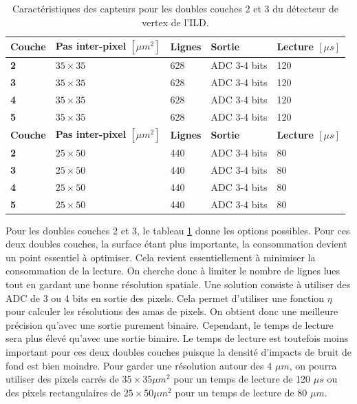   \begin{table}[h]
  \centering
  \begin{tabular}{|l|l|l|l|l|}
  \hline
  \textbf{Couche} & \textbf{Pas inter-pixel $[\mu m^2]$}  & \textbf{Lignes} & \textbf{Sortie} & \textbf{Lecture $[\mu s]$} \\ \hline
  \textbf{2}      & $35 \times 35$                       & 628             & ADC 3-4 bits    & 120                        \\ \hline
  \textbf{3}      & $35 \times 35$                       & 628             & ADC 3-4 bits    & 120                        \\ \hline
  \textbf{4}      & $35 \times 35$                       & 628             & ADC 3-4 bits    & 120                        \\ \hline
  \textbf{5}      & $35 \times 35$                       & 628             & ADC 3-4 bits    & 120                        \\ \hline
  \textbf{Couche} & \textbf{Pas inter-pixel $[\mu m^2]$} & \textbf{Lignes} & \textbf{Sortie} & \textbf{Lecture $[\mu s]$} \\ \hline
  \textbf{2}      & $25 \times 50$                       & 440             & ADC 3-4 bits    & 80                         \\ \hline
  \textbf{3}      & $25 \times 50$                       & 440             & ADC 3-4 bits    & 80                         \\ \hline
  \textbf{4}      & $25 \times 50$                       & 440             & ADC 3-4 bits    & 80                         \\ \hline
  \textbf{5}      & $25 \times 50$                       & 440             & ADC 3-4 bits    & 80                         \\ \hline
  \end{tabular}
  \caption{Caract\'eristiques des capteurs pour les doubles couches 2 et 3 du d\'etecteur de vertex de l'ILD.}
  \label{tab:L2_L5_prop}
  \end{table}
  
  \medskip
  
  Pour les doubles couches 2 et 3, le tableau \ref{tab:L2_L5_prop} donne les options possibles. Pour ces deux doubles couches, la surface \'etant plus importante, la consommation devient un point essentiel \`a optimiser. Cela revient essentiellement à minimiser la consommation de la lecture. On cherche donc \`a limiter le nombre de lignes lues tout en gardant une bonne r\'esolution spatiale. Une solution consiste \`a utiliser des ADC de 3 ou 4 bits en sortie des pixels. Cela permet d'utiliser une fonction $\eta$ pour calculer les r\'esolutions des amas de pixels. On obtient donc une meilleure pr\'ecision qu'avec une sortie purement binaire. Cependant, le temps de lecture sera plus \'elev\'e qu'avec une sortie binaire. Le temps de lecture est toutefois moins important pour ces deux doubles couches puisque la densit\'e d'impacts de bruit de fond est bien moindre. Pour garder une r\'esolution autour des 4 $\mu m$, on pourra utiliser des pixels carr\'es de $35 \times 35 \mu m^2$ pour un temps de lecture de 120 $\mu s$ ou des pixels rectangulaires de $25 \times 50 \mu m^2$ pour un temps de lecture de 80 $\mu m$.
  
